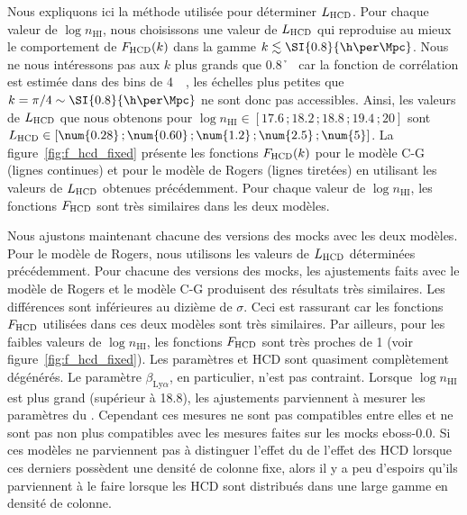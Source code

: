 Nous expliquons ici la méthode utilisée pour déterminer $L_{\textsc{HCD}}$.
Pour chaque valeur de $\log n_{\mathrm{HI}}$, nous choisissons une valeur de $L_{\textsc{HCD}}$ qui reproduise au mieux le comportement de $F_{\textsc{HCD}}(k)$ dans la gamme $k \lesssim \SI{0.8}{\h\per\Mpc}$. %
Nous ne nous intéressons pas aux $k$ plus grands que \SI{0.8}{\h\per\Mpc} car la fonction de corrélation est estimée dans des bins de \SI{4}{\perh\Mpc}, les échelles plus petites que $k = \pi / 4 \sim \SI{0.8}{\h\per\Mpc}$ ne sont donc pas accessibles.
Ainsi, les valeurs de $L_{\textsc{HCD}}$ que nous obtenons pour $\log n_{\mathrm{HI}} \in [\num{17.6}\,;\num{18.2}\,;\num{18.8}\,;\num{19.4}\,;\num{20}]$ sont $L_{\textsc{HCD}} \in [\num{0.28}\,; \num{0.60}\,; \num{1.2}\,; \num{2.5}\,; \num{5}]$.
La figure~\ref{fig:f_hcd_fixed} présente les fonctions $F_{\textsc{HCD}}(k)$ pour le modèle C-G (lignes continues) et pour le modèle de Rogers (lignes tiretées) en utilisant les valeurs de $L_{\textsc{HCD}}$ obtenues précédemment.
Pour chaque valeur de $\log n_{\mathrm{HI}}$, les fonctions $F_{\textsc{HCD}}$ sont très similaires dans les deux modèles.

Nous ajustons maintenant chacune des versions des mocks avec les deux modèles. Pour le modèle de Rogers, nous utilisons les valeurs de $L_{\textsc{HCD}}$ déterminées précédemment.
Pour chacune des versions des mocks, les ajustements faits avec le modèle de Rogers et le modèle C-G produisent des résultats très similaires. Les différences sont inférieures au dizième de $\sigma$.
Ceci est rassurant car les fonctions $F_{\textsc{HCD}}$ utilisées dans ces deux modèles sont très similaires.
Par ailleurs, pour les faibles valeurs de $\log n_{\mathrm{HI}}$, les fonctions $F_{\textsc{HCD}}$ sont très proches de 1 (voir figure~\ref{fig:f_hcd_fixed}). Les paramètres \lya{} et HCD sont quasiment complètement dégénérés. Le paramètre $\beta_{\mathrm{Ly}\alpha}$, en particulier, n'est pas contraint.  Lorsque $\log n_{\mathrm{HI}}$ est plus grand (supérieur à \num{18.8}), les ajustements parviennent à mesurer les paramètres du \lya{}.
Cependant ces mesures ne sont pas compatibles entre elles et ne sont pas non plus compatibles avec les mesures faites sur les mocks eboss-0.0.
Si ces modèles ne parviennent pas à distinguer l'effet du \lya{} de l'effet des HCD lorsque ces derniers possèdent une densité de colonne fixe, alors il y a peu d'espoirs qu'ils parviennent à le faire lorsque les HCD sont distribués dans une large gamme en densité de colonne.

